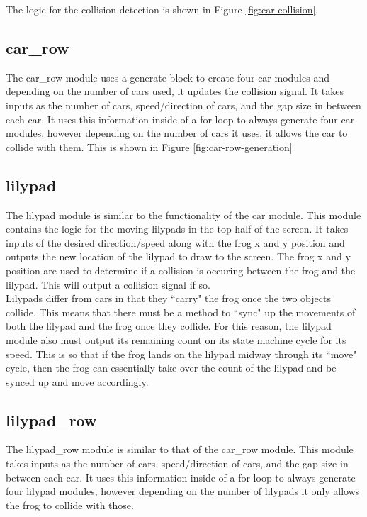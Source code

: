 \documentclass[journal, twocolumn, final,11pt,letterpaper]{IEEEtran}
\begin{document}
	The logic for the collision detection is shown in Figure \ref{fig:car-collision}.
	

	\subsection{car\_row}
	The car\_row module uses a generate block to create four car modules and depending on the number of cars used, it updates the collision signal. It takes inputs as the number of cars, speed/direction of cars, and the gap size in between each car. It uses this information inside of a for loop to always generate four car modules, however depending on the number of cars it uses, it allows the car to collide with them. This is shown in Figure \ref{fig:car-row-generation}
	
	
	\subsection{lilypad}
	The lilypad module is similar to the functionality of the car module. This module contains the logic for the moving lilypads in the top half of the screen. It takes inputs of the desired direction/speed along with the frog x and y position and outputs the new location of the lilypad to draw to the screen. The frog x and y position are used to determine if a collision is occuring between the frog and the lilypad. This will output a collision signal if so. \\
	
	Lilypads differ from cars in that they ``carry" the frog once the two objects collide. This means that there must be a method to ``sync" up the movements of both the lilypad and the frog once they collide. For this reason, the lilypad module also must output its remaining count on its state machine cycle for its speed. This is so that if the frog lands on the lilypad midway through its ``move" cycle, then the frog can essentially take over the count of the lilypad and be synced up and move accordingly.
	
	\subsection{lilypad\_row}
	The lilypad\_row module is similar to that of the car\_row module. This module takes inputs as the number of cars, speed/direction of cars, and the gap size in between each car. It uses this information inside of a for-loop to always generate four lilypad modules, however depending on the number of lilypads it only allows the frog to collide with those.
	
\end{document}
